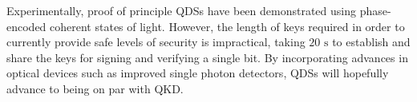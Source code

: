 \documentclass[%
 reprint,
 amsmath,amssymb,
 aps,
 pra,
]{revtex4-1}
\begin{document}
Experimentally, proof of principle QDSs have been demonstrated using phase-encoded coherent states of light. However, the length of keys required in order to currently provide safe levels of security is impractical, taking $20\text{ s}$ to establish and share the keys for signing and verifying a single bit. By incorporating advances in optical devices such as improved single photon detectors, QDSs will hopefully advance to being on par with QKD.


\appendix
\end{document}
